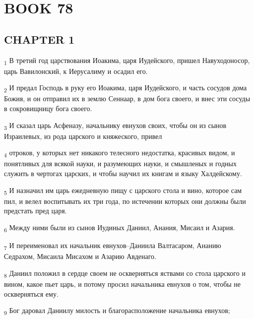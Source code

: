 \section{BOOK 78}
\subsection{CHAPTER 1}
\begin{tcolorbox}
\textsubscript{1} В третий год царствования Иоакима, царя Иудейского, пришел Навуходоносор, царь Вавилонский, к Иерусалиму и осадил его.
\end{tcolorbox}
\begin{tcolorbox}
\textsubscript{2} И предал Господь в руку его Иоакима, царя Иудейского, и часть сосудов дома Божия, и он отправил их в землю Сеннаар, в дом бога своего, и внес эти сосуды в сокровищницу бога своего.
\end{tcolorbox}
\begin{tcolorbox}
\textsubscript{3} И сказал царь Асфеназу, начальнику евнухов своих, чтобы он из сынов Израилевых, из рода царского и княжеского, привел
\end{tcolorbox}
\begin{tcolorbox}
\textsubscript{4} отроков, у которых нет никакого телесного недостатка, красивых видом, и понятливых для всякой науки, и разумеющих науки, и смышленых и годных служить в чертогах царских, и чтобы научил их книгам и языку Халдейскому.
\end{tcolorbox}
\begin{tcolorbox}
\textsubscript{5} И назначил им царь ежедневную пищу с царского стола и вино, которое сам пил, и велел воспитывать их три года, по истечении которых они должны были предстать пред царя.
\end{tcolorbox}
\begin{tcolorbox}
\textsubscript{6} Между ними были из сынов Иудиных Даниил, Анания, Мисаил и Азария.
\end{tcolorbox}
\begin{tcolorbox}
\textsubscript{7} И переименовал их начальник евнухов--Даниила Валтасаром, Ананию Седрахом, Мисаила Мисахом и Азарию Авденаго.
\end{tcolorbox}
\begin{tcolorbox}
\textsubscript{8} Даниил положил в сердце своем не оскверняться яствами со стола царского и вином, какое пьет царь, и потому просил начальника евнухов о том, чтобы не оскверняться ему.
\end{tcolorbox}
\begin{tcolorbox}
\textsubscript{9} Бог даровал Даниилу милость и благорасположение начальника евнухов;
\end{tcolorbox}
